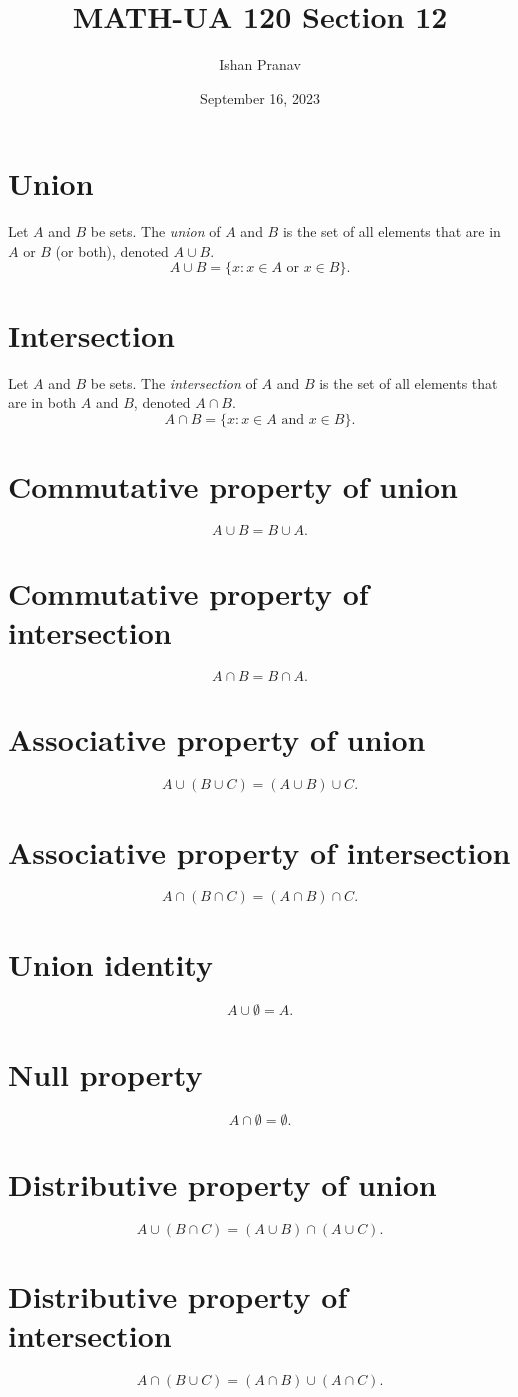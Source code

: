 \documentclass[12pt]{article}
\title{MATH-UA 120 Section 12}
\author{Ishan Pranav}
\date{September 16, 2023}
\begin{document}
\maketitle
\section*{Union}
Let $A$ and $B$ be sets. The \textit{union} of $A$ and $B$ is the set of all elements that are in $A$ or $B$ (or both), denoted $A\cup B$.
\[A\cup B=\{x:x\in A\text{ or }x\in B\}.\]
\section*{Intersection}
Let $A$ and $B$ be sets. The \textit{intersection} of $A$ and $B$ is the set of all elements that are in both $A$ and $B$, denoted $A\cap B$.
\[A\cap B=\{x:x\in A\text{ and }x\in B\}.\]
\section*{Commutative property of union}
\[A\cup B=B\cup A.\]
\section*{Commutative property of intersection}
\[A\cap B=B\cap A.\]
\section*{Associative property of union}
\[A\cup(B\cup C)=(A\cup B)\cup C.\]
\section*{Associative property of intersection}
\[A\cap(B\cap C)=(A\cap B)\cap C.\]
\section*{Union identity}
\[A\cup\emptyset=A.\]
\section*{Null property}
\[A\cap\emptyset=\emptyset.\]
\section*{Distributive property of union}
\[A\cup(B\cap C)=(A\cup B)\cap(A\cup C).\]
\section*{Distributive property of intersection}
\[A\cap(B\cup C)=(A\cap B)\cup(A\cap C).\]
\end{document}
